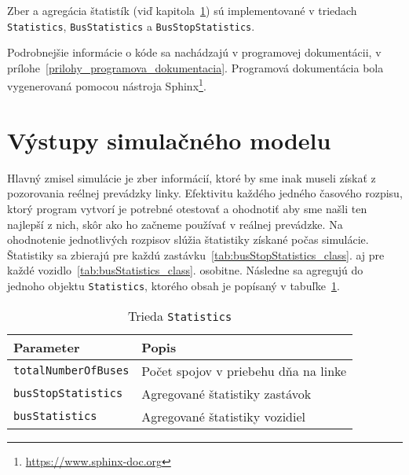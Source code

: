 Zber a agregácia štatistík (viď kapitola~\ref{vystupy_simulacneho_modelu}) sú implementované v triedach \texttt{Statistics}, \texttt{BusStatistics} a \texttt{BusStopStatistics}.

Podrobnejšie informácie o kóde sa nachádzajú v programovej dokumentácii, v prílohe~\ref{prilohy_programova_dokumentacia}.
Programová dokumentácia bola vygenerovaná pomocou nástroja Sphinx\footnote{\url{https://www.sphinx-doc.org}}.

\section{Výstupy simulačného modelu}
\label{vystupy_simulacneho_modelu}

Hlavný zmisel simulácie je zber informácií, ktoré by sme inak museli získať z pozorovania reélnej prevádzky linky.
Efektivitu každého jedného časového rozpisu, ktorý program vytvorí je potrebné otestovať a ohodnotiť aby sme našli ten najlepší z nich, skôr ako ho začneme používať v reálnej prevádzke.
Na ohodnotenie jednotlivých rozpisov slúžia štatistiky získané počas simulácie.
Štatistiky sa zbierajú pre každú zastávku~\ref{tab:busStopStatistics_class}. aj pre každé vozidlo~\ref{tab:busStatistics_class}. osobitne.
Následne sa agregujú do jednoho objektu \texttt{Statistics}, ktorého obsah je popísaný v tabuľke~\ref{tab:statistics_class}.
\begin{table}[h]\label{tab:statistics_class}
  \centering
  \begin{tabularx}{\textwidth}{|l|X|}
    \hline
    \textbf{Parameter} & \textbf{Popis} \\ \hline
    \texttt{totalNumberOfBuses} & Počet spojov v priebehu dňa na linke \\ \hline
    \texttt{busStopStatistics} & Agregované štatistiky zastávok \\ \hline
    \texttt{busStatistics} & Agregované štatistiky vozidiel \\ \hline
  \end{tabularx}
  \caption{Trieda \texttt{Statistics}}
\end{table}

